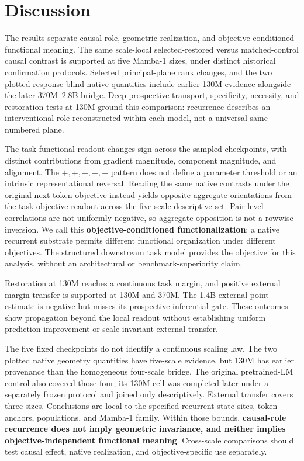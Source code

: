 \documentclass{article}
\begin{document}
\section{Discussion}
\label{sec:discussion}

The results separate causal role, geometric realization, and objective-conditioned functional meaning. The same scale-local selected-restored versus matched-control causal contrast is supported at five Mamba-1 sizes, under distinct historical confirmation protocols. Selected principal-plane rank changes, and the two plotted response-blind native quantities include earlier 130M evidence alongside the later 370M--2.8B bridge. Deep prospective transport, specificity, necessity, and restoration tests at 130M ground this comparison: recurrence describes an interventional role reconstructed within each model, not a universal same-numbered plane.

The task-functional readout changes sign across the sampled checkpoints, with distinct contributions from gradient magnitude, component magnitude, and alignment. The $+,+,+,-,-$ pattern does not define a parameter threshold or an intrinsic representational reversal. Reading the same native contrasts under the original next-token objective instead yields opposite aggregate orientations from the task-objective readout across the five-scale descriptive set. Pair-level correlations are not uniformly negative, so aggregate opposition is not a rowwise inversion. We call this \textbf{objective-conditioned functionalization}: a native recurrent substrate permits different functional organization under different objectives. The structured downstream task model provides the objective for this analysis, without an architectural or benchmark-superiority claim.

Restoration at 130M reaches a continuous task margin, and positive external margin transfer is supported at 130M and 370M. The 1.4B external point estimate is negative but misses its prospective inferential gate. These outcomes show propagation beyond the local readout without establishing uniform prediction improvement or scale-invariant external transfer.

The five fixed checkpoints do not identify a continuous scaling law. The two plotted native geometry quantities have five-scale evidence, but 130M has earlier provenance than the homogeneous four-scale bridge. The original pretrained-LM control also covered those four; its 130M cell was completed later under a separately frozen protocol and joined only descriptively. External transfer covers three sizes. Conclusions are local to the specified recurrent-state sites, token anchors, populations, and Mamba-1 family. Within those bounds, \textbf{causal-role recurrence does not imply geometric invariance, and neither implies objective-independent functional meaning}. Cross-scale comparisons should test causal effect, native realization, and objective-specific use separately.
\end{document}
